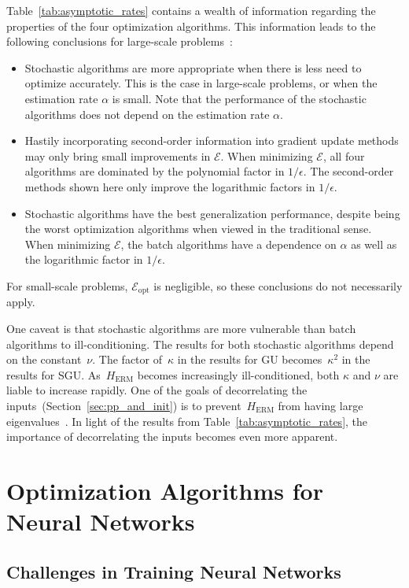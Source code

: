 \documentclass[11pt,a4paper]{article}
\numberwithin{equation}{section}
\newcommand{\opterr}{\mathcal{E}_{\mathrm{opt}}}
\begin{document}
Table~\ref{tab:asymptotic_rates} contains a wealth of information regarding the
properties of the four optimization algorithms. This information leads to the
following conclusions for large-scale problems~\citep{bousquet2008tradeoffs}:
\begin{itemize}
\item Stochastic algorithms are more appropriate when there is less need to
optimize accurately. This is the case in large-scale problems, or when the
estimation rate $\alpha$ is small. Note that the performance of the stochastic
algorithms does not depend on the estimation rate $\alpha$.

\item Hastily incorporating second-order information into gradient update
methods may only bring small improvements in $\mathcal{E}$. When minimizing
$\mathcal{E}$, all four algorithms are dominated by the polynomial factor in
$1/\epsilon$. The second-order methods shown here only improve the logarithmic
factors in $1/\epsilon$.

\item Stochastic algorithms have the best generalization performance, despite
being the worst optimization algorithms when viewed in the traditional sense.
When minimizing $\mathcal{E}$, the batch algorithms have a dependence on
$\alpha$ as well as the logarithmic factor in $1/\epsilon$.
\end{itemize}
For small-scale problems, $\opterr$ is negligible, so these conclusions do not
necessarily apply.

One caveat is that stochastic algorithms are more vulnerable than batch
algorithms to ill-conditioning. The results for both stochastic algorithms
depend on the constant~$\nu$. The factor of~$\kappa$ in the results for GU
becomes~$\kappa^2$ in the results for SGU. As~$H_{\text{ERM}}$ becomes
increasingly ill-conditioned, both $\kappa$ and $\nu$ are liable to increase
rapidly. One of the goals of decorrelating the
inputs~(Section~\ref{sec:pp_and_init}) is to prevent~$H_{\text{ERM}}$ from
having large eigenvalues~\citep{lecun-98b}. In light of the results from
Table~\ref{tab:asymptotic_rates}, the importance of decorrelating the inputs
becomes even more apparent.

\section{Optimization Algorithms for Neural Networks}

\subsection{Challenges in Training Neural Networks}
\end{document}
